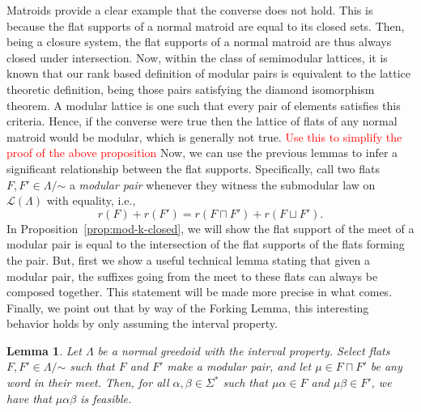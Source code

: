 \documentclass[11pt]{article}
\newtheorem{lemma}[theorem]{Lemma}
\newcommand{\univ}{\Sigma}
\newcommand{\glang}{\Lambda}
\providecommand{\L}{}
\renewcommand{\L}{\mathscr{L}}
\begin{document}
    Matroids provide a clear example that the converse does not hold.
    This is because the flat supports of a normal matroid are equal to its closed sets.
    Then, being a closure system, the flat supports of a normal matroid are thus always closed under intersection.
    Now, within the class of semimodular lattices, it is known that our rank based definition of modular pairs is equivalent to the lattice theoretic definition, being those pairs satisfying the diamond isomorphism theorem.
    A modular lattice is one such that every pair of elements satisfies this criteria.
    Hence, if the converse were true then the lattice of flats of any normal matroid would be modular, which is generally not true.
\textcolor{red}{Use this to simplify the proof of the above proposition}
\fi
\iffalse
Now, we can use the previous lemmas to infer a significant relationship between the flat supports.
Specifically, call two flats $F,F'\in\glang/\mathord{\sim}$ a \emph{modular pair} whenever they witness the submodular law on $\L(\glang)$ with equality, i.e.,
\[
    r(F) + r(F') = r(F\sqcap F') + r(F\sqcup F').
\]
In Proposition~\ref{prop:mod-k-closed}, we will show the flat support of the meet of a modular pair is equal to the intersection of the flat supports of the flats forming the pair.
But, first we show a useful technical lemma stating that given a modular pair, the suffixes going from the meet to these flats can always be composed together.
This statement will be made more precise in what comes.
Finally, we point out that by way of the Forking Lemma, this interesting behavior holds by only assuming the interval property.
\begin{lemma}\label{lem:modular-concatenation}
    Let $\glang$ be a normal greedoid with the interval property.
    Select flats $F, F'\in\glang/\mathord{\sim}$ such that $F$ and $F'$ make a modular pair, and let $\mu\in F\sqcap F'$ be any word in their meet.
    Then, for all $\alpha,\beta \in \univ^*$ such that $\mu \alpha \in F$ and $\mu\beta \in F'$, we have that $\mu \alpha \beta$ is feasible.
\end{lemma}
\end{document}
